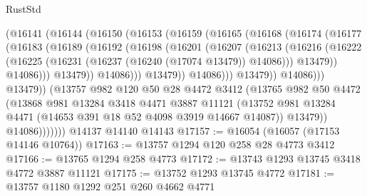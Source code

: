 \begin{lexlean}{RustStd}
\begin{coremodule}
                        (@16141
                          (@16144
                            (@16150
                              (@16153
                                (@16159
                                  (@16165
                                    (@16168
                                      (@16174
                                        (@16177
                                          (@16183
                                            (@16189
                                              (@16192
                                                (@16198
                                                  (@16201
                                                    (@16207
                                                      (@16213
                                                        (@16216
                                                          (@16222
                                                            (@16225
                                                              (@16231
                                                                (@16237
                                                                  (@16240 (@17074 @13479))
                                                                  @14086)))
                                                            @13479))
                                                        @14086)))
                                                  @13479))
                                              @14086)))
                                        @13479))
                                    @14086)))
                              @13479))
                          @14086)))
                    @13479))
                (@13757
                  @982
                  @120
                  @50
                  @28
                  @4472
                  @3412
                  (@13765
                    @982
                    @50
                    @4472
                    (@13868
                      @981
                      @13284
                      @3418
                      @4471
                      @3887
                      @11121
                      (@13752 @981 @13284 @4471 (@14653 @391 @18 @52 @4098 @3919 @14667 @14087))
                      @13479))
                  @14086)))))))
    @14137
    @14140
    @14143
@17157 := @16054 (@16057 (@17153 @14146 @10764))
@17163 := @13757 @1294 @120 @258 @28 @4773 @3412
@17166 := @13765 @1294 @258 @4773
@17172 := @13743 @1293 @13745 @3418 @4772 @3887 @11121
@17175 := @13752 @1293 @13745 @4772
@17181 := @13757 @1180 @1292 @251 @260 @4662 @4771

\end{coremodule}
\end{lexlean}
